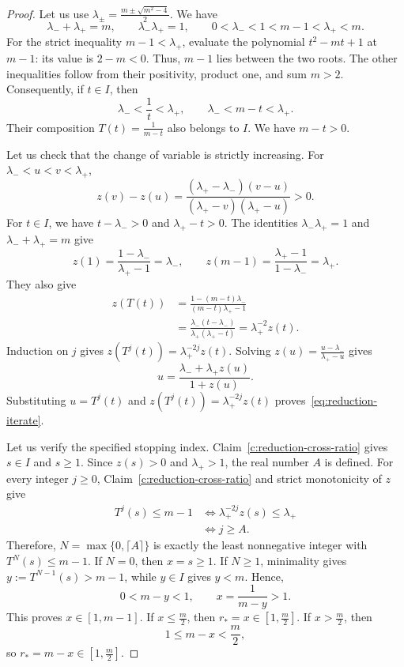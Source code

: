 \begin{proof}
 Let us use $\lambda_\pm=\frac{m\pm\sqrt{m^2-4}}2$. We have
\[
 \lambda_-+\lambda_+=m,\qquad \lambda_-\lambda_+=1,
 \qquad 0<\lambda_-<1<m-1<\lambda_+<m.
\]
For the strict inequality $m-1<\lambda_+$, evaluate the polynomial $t^2-mt+1$ at $m-1$: its value is $2-m<0$. Thus, $m-1$ lies between the two roots. The other inequalities follow from their positivity, product one, and sum $m>2$. Consequently, if $t\in I$, then
\[
 \lambda_-<\frac1t<\lambda_+,\qquad
 \lambda_-<m-t<\lambda_+.
\]
Their composition $T(t)=\frac1{m-t}$ also belongs to $I$. We have $m-t>0$.

Let us check that the change of variable is strictly increasing.
For $\lambda_-<u<v<\lambda_+$,
\[
 z(v)-z(u)=
 \frac{(\lambda_+-\lambda_-)(v-u)}{(\lambda_+-v)(\lambda_+-u)}>0.
\]
For $t\in I$, we have $t-\lambda_->0$ and $\lambda_+-t>0$. The identities $\lambda_-\lambda_+=1$ and $\lambda_-+\lambda_+=m$ give
\[
 z(1)=\frac{1-\lambda_-}{\lambda_+-1}=\lambda_-,\qquad
 z(m-1)=\frac{\lambda_+-1}{1-\lambda_-}=\lambda_+.
\]
They also give
\[
 \begin{aligned}
 z(T(t))
 &=\frac{1-(m-t)\lambda_-}{(m-t)\lambda_+-1}\\
 &=\frac{\lambda_-(t-\lambda_-)}{\lambda_+(\lambda_+-t)}
 =\lambda_+^{-2}z(t).
 \end{aligned}
\]
Induction on $j$ gives $z(T^j(t))=\lambda_+^{-2j}z(t)$. Solving $z(u)=\frac{u-\lambda_-}{\lambda_+-u}$ gives
\[
 u=\frac{\lambda_-+\lambda_+z(u)}{1+z(u)}.
\]
Substituting $u=T^j(t)$ and $z(T^j(t))=\lambda_+^{-2j}z(t)$ proves~\eqref{eq:reduction-iterate}.

 Let us verify the specified stopping index. Claim~\ref{c:reduction-cross-ratio} gives $s\in I$ and $s\ge1$. Since $z(s)>0$ and $\lambda_+>1$, the real number $A$ is defined. For every integer $j\ge0$, Claim~\ref{c:reduction-cross-ratio} and strict monotonicity of $z$ give
\[
 \begin{aligned}
 T^j(s)\le m-1
 &\Longleftrightarrow\lambda_+^{-2j}z(s)\le\lambda_+\\
 &\Longleftrightarrow j\ge A.
 \end{aligned}
\]
Therefore, $N=\max\{0,\lceil A\rceil\}$ is exactly the least nonnegative integer with $T^N(s)\le m-1$. If $N=0$, then $x=s\ge1$. If $N\ge1$, minimality gives $y:=T^{N-1}(s)>m-1$, while $y\in I$ gives $y<m$. Hence,
\[
 0<m-y<1,\qquad x=\frac1{m-y}>1.
\]
This proves $x\in[1,m-1]$. If $x\le \frac m2$, then $r_*=x\in[1,\frac m2]$. If $x>\frac m2$, then
\[
 1\le m-x<\frac m2,
\]
so $r_*=m-x\in[1,\frac m2]$.


\end{proof}
